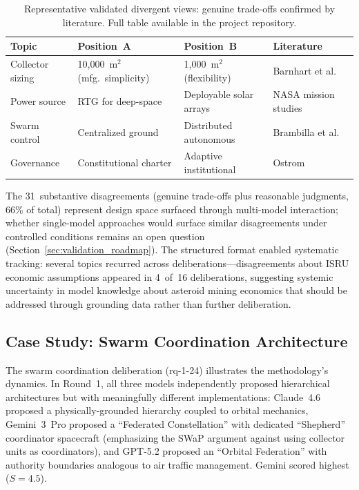 \documentclass[11pt,a4paper]{article}
\begin{document}
\begin{table}[ht]
\centering
\caption{Representative validated divergent views: genuine trade-offs confirmed by literature. Full table available in the project repository.}
\label{tab:validated_divergent}
\begin{tabular}{@{}p{2.2cm}p{3.2cm}p{3.2cm}p{4cm}@{}}
\toprule
\textbf{Topic} & \textbf{Position~A} & \textbf{Position~B} & \textbf{Literature} \\
\midrule
Collector sizing & 10{,}000~m$^2$ (mfg.\ simplicity) & 1{,}000~m$^2$ (flexibility) & Barnhart et al.~\cite{barnhart2007smallsat} \\
Power source & RTG for deep-space & Deployable solar arrays & NASA mission studies~\cite{nasa2020se} \\
Swarm control & Centralized ground & Distributed autonomous & Brambilla et al.~\cite{brambilla2013swarm} \\
Governance & Constitutional charter & Adaptive institutional & Ostrom~\cite{ostrom1990governing} \\
\bottomrule
\end{tabular}
\end{table}

The 31~substantive disagreements (genuine trade-offs plus reasonable judgments, 66\% of total) represent design space surfaced through multi-model interaction; whether single-model approaches would surface similar disagreements under controlled conditions remains an open question (Section~\ref{sec:validation_roadmap}). The structured format enabled systematic tracking: several topics recurred across deliberations---disagreements about ISRU economic assumptions appeared in 4~of~16 deliberations, suggesting systemic uncertainty in model knowledge about asteroid mining economics that should be addressed through grounding data rather than further deliberation.

\subsection{Case Study: Swarm Coordination Architecture}

The swarm coordination deliberation (rq-1-24) illustrates the methodology's dynamics. In Round~1, all three models independently proposed hierarchical architectures but with meaningfully different implementations: Claude~4.6 proposed a physically-grounded hierarchy coupled to orbital mechanics, Gemini~3~Pro proposed a ``Federated Constellation'' with dedicated ``Shepherd'' coordinator spacecraft (emphasizing the SWaP argument against using collector units as coordinators), and GPT-5.2 proposed an ``Orbital Federation'' with authority boundaries analogous to air traffic management. Gemini scored highest ($S = 4.5$).
\end{document}
